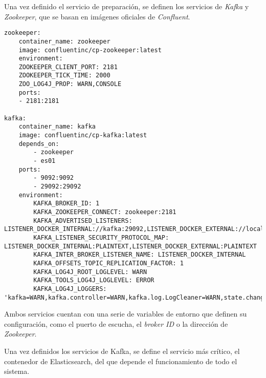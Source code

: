 Una vez definido el servicio de preparación, se definen los servicios de
\textit{Kafka} y \textit{Zookeeper}, que se basan en imágenes oficiales de
\textit{Confluent}.

\begin{lstlisting}[style=yaml, caption={Definición de los servicios de Kafka}]
zookeeper:
	container_name: zookeeper
	image: confluentinc/cp-zookeeper:latest
	environment:
	ZOOKEEPER_CLIENT_PORT: 2181
	ZOOKEEPER_TICK_TIME: 2000
	ZOO_LOG4J_PROP: WARN,CONSOLE
	ports:
	- 2181:2181

kafka:
	container_name: kafka
	image: confluentinc/cp-kafka:latest
	depends_on:
		- zookeeper
		- es01
	ports:
		- 9092:9092
		- 29092:29092
	environment:
		KAFKA_BROKER_ID: 1
		KAFKA_ZOOKEEPER_CONNECT: zookeeper:2181
		KAFKA_ADVERTISED_LISTENERS: LISTENER_DOCKER_INTERNAL://kafka:29092,LISTENER_DOCKER_EXTERNAL://localhost:9092
		KAFKA_LISTENER_SECURITY_PROTOCOL_MAP: LISTENER_DOCKER_INTERNAL:PLAINTEXT,LISTENER_DOCKER_EXTERNAL:PLAINTEXT
		KAFKA_INTER_BROKER_LISTENER_NAME: LISTENER_DOCKER_INTERNAL
		KAFKA_OFFSETS_TOPIC_REPLICATION_FACTOR: 1
		KAFKA_LOG4J_ROOT_LOGLEVEL: WARN
		KAFKA_TOOLS_LOG4J_LOGLEVEL: ERROR
		KAFKA_LOG4J_LOGGERS: 'kafka=WARN,kafka.controller=WARN,kafka.log.LogCleaner=WARN,state.change.logger=WARN,kafka.producer.async.DefaultEventHandler=WARN'
\end{lstlisting}

Ambos servicios cuentan con una serie de variables de entorno que definen su
configuración, como el puerto de escucha, el \textit{broker ID} o la dirección
de \textit{Zookeeper}.

Una vez definidos los servicios de Kafka, se define el servicio más crítico, el
contenedor de Elasticsearch, del que depende el funcionamiento de todo el
sistema.

